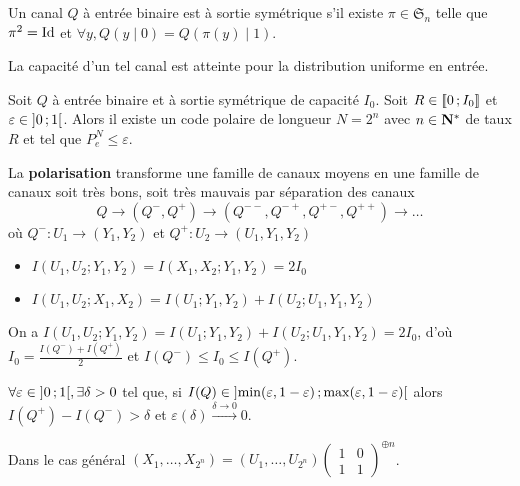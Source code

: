 \begin{defn}
	Un canal $Q$ à entrée binaire est à sortie symétrique s'il existe $\pi \in \mathfrak{S}_n$ telle que $\pi^2 = \operatorname{Id}$ et $\forall y, Q(y \mid 0) = Q(\pi(y) \mid 1)$.
\end{defn}

\begin{rem}
	La capacité d'un tel canal est atteinte pour la distribution uniforme en entrée.
\end{rem}

\begin{thm}
	Soit $Q$ à entrée binaire et à sortie symétrique de capacité $I_0$.
	Soit $R \in \mathopen{[\![}0\mathclose{}\mathpunct{};I_0\mathclose{]\!]}$ et $\varepsilon \in \mathopen{]}0\mathclose{}\mathpunct{};1\mathclose{[}$.
	Alors il existe un code polaire de longueur $N = 2^n$ avec $n \in \mathbf{N}^*$ de taux $R$ et tel que $P_e^N \leq \varepsilon$.
\end{thm}

La \textbf{polarisation} transforme une famille de canaux moyens en une famille de canaux soit très bons,
soit très mauvais par séparation des canaux
$$Q \longrightarrow (Q^-,Q^+) \longrightarrow (Q^{--},Q^{-+},Q^{+-},Q^{++}) \longrightarrow \ldots$$
où $Q^- \colon U_1 \to (Y_1,Y_2)$ et $Q^+ \colon U_2 \to (U_1,Y_1,Y_2)$

\begin{pop}
	\begin{itemize}
		\item[\textbullet] $I(U_1,U_2 ; Y_1,Y_2) = I(X_1,X_2 ; Y_1,Y_2) = 2 I_0$
		\item[\textbullet] $I(U_1,U_2 ; X_1,X_2) = I(U_1 ; Y_1,Y_2) + I(U_2 ; U_1,Y_1,Y_2)$
	\end{itemize}
\end{pop}

\begin{cor}
	On a $I(U_1,U_2 ; Y_1,Y_2) = I(U_1 ; Y_1,Y_2) + I(U_2 ; U_1,Y_1,Y_2) = 2 I_0$, d'où $I_0 = \frac{I(Q^-) + I(Q^+)}{2}$ et $I(Q^-) \leq I_0 \leq I(Q^+)$.
\end{cor}

\begin{lem}
	$\forall \varepsilon \in \mathopen{}\mathclose{\left]0\mathclose{}\mathpunct{};1\right[}, \exists \delta > 0$ tel que, si $I(Q) \in \mathopen{]}\min(\varepsilon, 1 - \varepsilon)\mathclose{}\mathpunct{};\max(\varepsilon, 1 - \varepsilon)\mathclose{[}$ alors $I(Q^+) - I(Q^-) > \delta$ et $\varepsilon(\delta) \overset{\delta \to 0}{\longrightarrow} 0$.
\end{lem}

Dans le cas général $(X_1,\ldots,X_{2^n}) = (U_1,\ldots,U_{2^n}) \begin{pmatrix} 1 & 0 \\ 1 & 1 \end{pmatrix}^{\oplus n}$.

